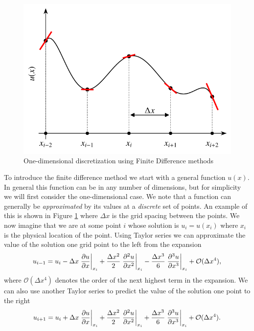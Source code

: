 \begin{figure}[htbp]
	\centering
	\includegraphics[width=0.6\linewidth]{Pictures/fd_scheme}
	\caption{One-dimensional discretization using Finite Difference methods}
	\label{fig:fd_scheme}
\end{figure}
	
To introduce the finite difference method we start with a general function $u(x)$. In general this function can be in any number of dimensions, but for simplicity we will first consider the one-dimensional case. We note that a function can generally be {\it approximated} by its values at a {\it discrete} set of points. An example of this is shown in Figure \ref{fig:fd_scheme} where $\Delta x$ is the grid spacing between the points. We now imagine that we are at some point $i$ whose solution is $u_i = u(x_i)$ where $x_i$ is the physical location of the point. Using Taylor series we can approximate the value of the solution one grid point to the left from the expansion
\begin{equation}
	u_{i-1} = u_i - \Delta x \left.\frac{\partial u}{\partial x}\right\rvert_{x_i}^{} + \frac{\Delta x^2}{2} \left.\frac{\partial^2 u}{\partial x^2}\right\rvert_{x_i}^{} - \frac{\Delta x^3}{6} \left.\frac{\partial^3 u}{\partial x^3}\right\rvert_{x_i}^{} + \mathcal{O}(\Delta x^4),
	\label{eqn:fdmup}
\end{equation}
where $\mathcal{O}(\Delta x^4)$ denotes the order of the next highest term in the expansion. We can also use another Taylor series to predict the value of the solution one point to the right
\begin{equation}
	u_{i+1} = u_i + \Delta x \left.\frac{\partial u}{\partial x}\right\rvert_{x_i}^{} + \frac{\Delta x^2}{2} \left.\frac{\partial^2 u}{\partial x^2}\right\rvert_{x_i}^{} + \frac{\Delta x^3}{6} \left.\frac{\partial^3 u}{\partial x^3}\right\rvert_{x_i}^{} + \mathcal{O}(\Delta x^4).
	\label{eqn:fdmdwn}
\end{equation}

